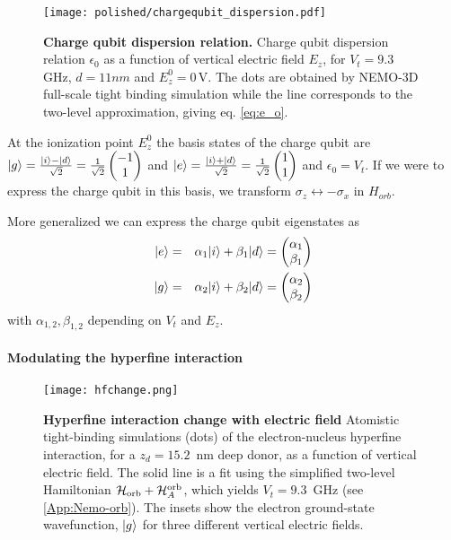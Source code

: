 \begin{figure}[h]
	\centering
	\texttt{[image: polished/chargequbit\_dispersion.pdf]}
	\caption[Charge qubit dispersion relation]{\textbf{Charge qubit dispersion relation.} Charge qubit dispersion relation $\epsilon_0$ as a function of vertical electric field $E_z$, for $V_t=9.3\,$GHz, $d=11nm$ and $E_z^0=0\,$V. The dots are obtained by NEMO-3D full-scale tight binding simulation while the line corresponds to the two-level approximation, giving eq. \eqref{eq:e_o}.}
	\label{fig:chargequbit}
\end{figure}

At the ionization point $E_z^0$ the basis states of the charge qubit are $|g\rangle=\frac{|i\rangle-|d\rangle}{\sqrt{2}}=\frac{1}{\sqrt{2}}\begin{pmatrix}-1\\1\end{pmatrix}$ and $|e\rangle=\frac{|i\rangle+|d\rangle}{\sqrt{2}}=\frac{1}{\sqrt{2}}\begin{pmatrix}1\\1\end{pmatrix}$ and $\epsilon_0=V_t$. 
If we were to express the charge qubit in this basis, we transform $\sigma_z\leftrightarrow-\sigma_x$ in $H_{orb}$.

More generalized we can express the charge qubit eigenstates as
\begin{eqnarray}\label{eq:chargestates}
|e\rangle&=&\alpha_1 |i\rangle+\beta_1|d\rangle=\begin{pmatrix}\alpha_1\\ \beta_1\end{pmatrix}\\
|g\rangle&=&\alpha_2 |i\rangle+\beta_2 |d\rangle =\begin{pmatrix}\alpha_2\\ \beta_2\end{pmatrix}
\end{eqnarray} with $\alpha_{1,2},\beta_{1,2}$ depending on $V_t$ and $E_z$. 


\paragraph{Modulating the hyperfine interaction}
 

\begin{figure}[h]
	\centering
	\texttt{[image: hfchange.png]}
	\caption[Hyperfine interaction change with electric field]{\textbf{Hyperfine interaction change with electric field} Atomistic tight-binding simulations \cite{Klimeck2007} (dots) of the electron-nucleus hyperfine interaction, for a $z_d=15.2$~nm deep donor, as a function of vertical electric field. The solid line is a fit using the simplified two-level Hamiltonian $\mathcal{H}_{\rm orb}+\mathcal{H}_A^{\rm orb}$, which yields $V_t=9.3$~GHz (see \ref{App:Nemo-orb}). The insets show the electron ground-state wavefunction, $|g\rangle$ for three different vertical electric fields.}
	\label{fig:hfchange}
\end{figure}

